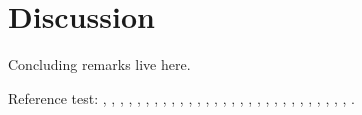 \section{Discussion}
\label{sec:discussion}

Concluding remarks live here.

Reference test:
\cite{ArcherWest2003},
\cite{BarrettJolleyetal2010},
\cite{BuckwalterMankin1998},
\cite{CarneyMuir1988},
\cite{Chaetal2009},
\cite{Chuetal2006},
\cite{Clarketal2011},
\cite{Edwardsetal1994},
\cite{Fassbender1987},
\cite{Grishkoetal2010},
\cite{Halletal1996},
\cite{Hille2001},
\cite{HorriganAldrich2002},
\cite{LeeUrban1997},
\cite{LesageLazdunski2000},
\cite{Lewisetal2011},
\cite{Maleckaretal2009},
\cite{Mankin1982},
\cite{MillwardSadleretal2000},
\cite{Nygrenetal1998},
\cite{Poole1997},
\cite{RadhakrishnanHindmarsh1993},
\cite{Scholz2002},
\cite{Stein1990},
\cite{Stockwell1991},
\cite{Sugimotoetal1996},
\cite{Tsugaetal2001},
\cite{UNKNOWN},
\cite{Wilkinsetal2000},
\cite{Wuetal2007}.

